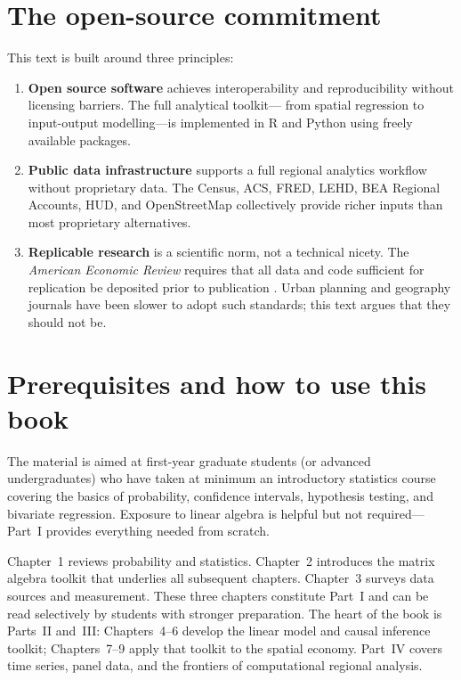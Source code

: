 \section*{The open-source commitment}

This text is built around three principles:

\begin{enumerate}
  \item \textbf{Open source software} achieves interoperability and
    reproducibility without licensing barriers. The full analytical toolkit---
    from spatial regression to input-output modelling---is implemented in R
    and Python using freely available packages.

  \item \textbf{Public data infrastructure} supports a full regional
    analytics workflow without proprietary data. The Census, ACS, FRED,
    LEHD, BEA Regional Accounts, HUD, and OpenStreetMap collectively provide
    richer inputs than most proprietary alternatives.

  \item \textbf{Replicable research} is a scientific norm, not a technical
    nicety. The \emph{American Economic Review} requires that all data and
    code sufficient for replication be deposited prior to publication
    \citep{AER2024}. Urban planning and geography journals have been slower to
    adopt such standards; this text argues that they should not be.
\end{enumerate}

\section*{Prerequisites and how to use this book}

The material is aimed at first-year graduate students (or advanced
undergraduates) who have taken at minimum an introductory statistics course
covering the basics of probability, confidence intervals, hypothesis testing,
and bivariate regression. Exposure to linear algebra is helpful but not
required---Part~I provides everything needed from scratch.

Chapter~1 reviews probability and statistics. Chapter~2 introduces the matrix
algebra toolkit that underlies all subsequent chapters. Chapter~3 surveys data
sources and measurement. These three chapters constitute Part~I and can be
read selectively by students with stronger preparation. The heart of the book
is Parts~II and~III: Chapters~4--6 develop the linear model and causal
inference toolkit; Chapters~7--9 apply that toolkit to the spatial economy.
Part~IV covers time series, panel data, and the frontiers of computational
regional analysis.

\renewcommand\bibname{Further reading}
\begin{subappendices}


\end{subappendices}
